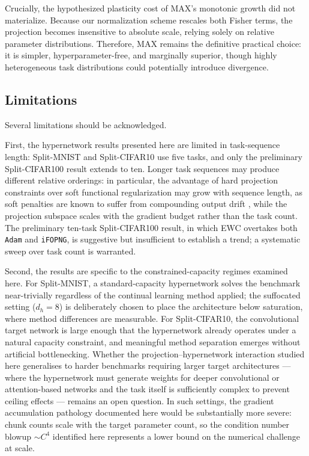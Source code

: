 Crucially, the hypothesized plasticity cost
of MAX's monotonic growth did not materialize.
Because our normalization scheme rescales
both Fisher terms, the projection becomes
insensitive to absolute scale, relying
solely on relative parameter distributions.
Therefore, MAX remains the definitive practical choice:
it is simpler, hyperparameter-free, and
marginally superior, though highly heterogeneous
task distributions could potentially introduce divergence.

\subsection{Limitations}
\label{sec:limitations}

Several limitations should be acknowledged.

First, the hypernetwork results presented here are limited in
task-sequence length: Split-MNIST and Split-CIFAR10 use five tasks, and
only the preliminary Split-CIFAR100 result extends to ten.
Longer task sequences may produce different relative orderings:
in particular, the advantage of hard projection constraints over soft
functional regularization may grow with sequence length, as soft
penalties are known to suffer from compounding output drift
\citep{farquhar_towards_2018}, while the projection subspace scales with
the gradient budget rather than the task count.
The preliminary ten-task Split-CIFAR100 result, in which EWC overtakes both
\texttt{Adam} and \texttt{iFOPNG}, is suggestive but insufficient to
establish a trend;
a systematic sweep over task count is warranted.

Second, the results are specific to the constrained-capacity regimes
examined here.
For Split-MNIST, a standard-capacity hypernetwork solves the benchmark
near-trivially regardless of the continual learning method applied;
the suffocated setting ($d_h = 8$) is deliberately chosen to place the
architecture below saturation, where method differences are measurable.
For Split-CIFAR10, the convolutional target network is large enough that
the hypernetwork already operates under a natural capacity constraint,
and meaningful method separation emerges without artificial bottlenecking.
Whether the projection--hypernetwork interaction studied here generalises
to harder benchmarks requiring larger target architectures --- where the
hypernetwork must generate weights for deeper convolutional or
attention-based networks and the task itself is sufficiently complex to
prevent ceiling effects --- remains an open question.
In such settings, the gradient accumulation pathology documented here
would be substantially more severe: chunk counts scale with the target
parameter count, so the condition number blowup $\sim C^4$ identified
here represents a lower bound on the numerical challenge at scale.

